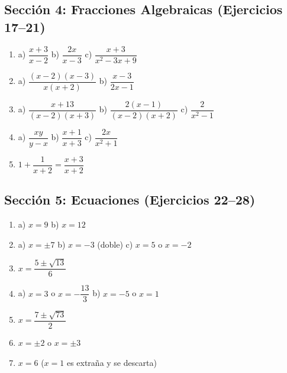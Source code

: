 \documentclass[12pt, letterpaper]{article}
\begin{document}
      \subsection*{Sección 4: Fracciones Algebraicas (Ejercicios 17--21)}
      \begin{enumerate}[resume=respuestas, leftmargin=*, label=\textbf{\arabic*.}]
            \item a) $\dfrac{x + 3}{x - 2}$ \quad b) $\dfrac{2x}{x - 3}$ \quad c) $\dfrac{x + 3}{x^2 - 3x + 9}$
            \item a) $\dfrac{(x - 2)(x - 3)}{x(x + 2)}$ \quad b) $\dfrac{x - 3}{2x - 1}$
            \item a) $\dfrac{x + 13}{(x - 2)(x + 3)}$ \quad b) $\dfrac{2(x - 1)}{(x - 2)(x + 2)}$ \quad c) $\dfrac{2}{x^2 - 1}$
            \item a) $\dfrac{xy}{y - x}$ \quad b) $\dfrac{x + 1}{x + 3}$ \quad c) $\dfrac{2x}{x^2 + 1}$
            \item $1 + \dfrac{1}{x + 2} = \dfrac{x + 3}{x + 2}$
      \end{enumerate}


      \subsection*{Sección 5: Ecuaciones (Ejercicios 22--28)}
      \begin{enumerate}[resume=respuestas, leftmargin=*, label=\textbf{\arabic*.}]
            \item a) $x = 9$ \quad b) $x = 12$
            \item a) $x = \pm 7$ \quad b) $x = -3$ (doble) \quad c) $x = 5$ o $x = -2$
            \item $x = \dfrac{5 \pm \sqrt{13}}{6}$
            \item a) $x = 3$ o $x = -\dfrac{13}{3}$ \quad b) $x = -5$ o $x = 1$
            \item $x = \dfrac{7 \pm \sqrt{73}}{2}$
            \item $x = \pm 2$ o $x = \pm 3$
            \item $x = 6$ ($x = 1$ es extraña y se descarta)
      \end{enumerate}
\end{document}
